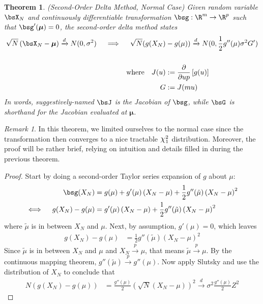 \documentclass[12pt]{article}
\theoremstyle{plain}
\newtheorem{thm}{Theorem}[section]
\theoremstyle{definition}
\theoremstyle{remark}
\newtheorem*{rmk}{Remark}
\newcommand*{\Chi}{\mbox{\large$\chi$}} %
\newcommand{\bsmu}{\boldsymbol{\mu}}
\newcommand{\pto}{\xrightarrow{p}}
\newcommand{\dto}{\xrightarrow{d}}
\begin{document}
\begin{thm}\emph{(Second-Order Delta Method, Normal Case)}
Given random variable $\bsX_N$ and continuously differentiable
transformation $\bsg:\R^m\rightarrow \R^p$
such that $\bsg'(\bsmu)=0$, the \emph{second-order delta method} states
\begin{align*}
  \sqrt{N}\left( \bsX_N -\bsmu \right)
  \dto N(0,\sigma^2)
  \quad\implies\quad
  \sqrt{N}(
  g(X_N) &- g(\mu))
  \dto
  N(0, \frac{1}{2}g''(\mu) \sigma^2 G')
  \\\\
  \text{where}\quad
  J(u)
  &:=\frac{\partial}{\partial up}
  \left[g(u)\right]\\
  G &:= J(mu)
\end{align*}
In words, suggestively-named $\bsJ$ is the Jacobian of $\bsg$, while
$\bsG$ is shorthand for the Jacobian evaluated at $\bsmu$.
\end{thm}
\begin{rmk}
In this theorem, we limited ourselves to the normal case since the
transformation then converges to a nice tractable $\Chi^2_1$
distribution. Moreover, the proof will be rather brief, relying on
intuition and details filled in during the previous theorem.
\end{rmk}
\begin{proof}
Start by doing a second-order Taylor series expansion of $g$ about $\mu$:
\begin{align*}
  \bsg(X_N)
  &=
  g(\mu)
  + g'(\mu) \left( X_N - \mu \right)
  + \frac{1}{2}g''(\tilde{\mu}) \left( X_N - \mu \right)^2
  \\
  \iff\quad
  g(X_N) - g(\mu)
  &=
  g'(\mu) \left( X_N - \mu \right)
  + \frac{1}{2}g''(\tilde{\mu}) \left( X_N - \mu \right)^2
\end{align*}
where $\tilde{\mu}$ is in between $X_N$ and $\mu$.
Next, by assumption, $g'(\mu)=0$, which leaves
\begin{align*}
  g(X_N) - g(\mu)
  &=
  \frac{1}{2}g''(\tilde{\mu}) \left( X_N - \mu \right)^2
\end{align*}
Since $\tilde{\mu}$ is in between $X_N$ and $\mu$ and
$X_N\pto \mu$, that means $\tilde{\mu}\pto \mu$.
By the continuous mapping theorem, $g''(\tilde{\mu})\pto g''(\mu)$.
Now apply Slutsky and use the distribution of $X_N$ to conclude that
\begin{align*}
  N\left(g(X_N) - g(\mu)\right)
  &=
  \frac{g''(\mu)}{2}
  \left(\sqrt{N}  \left( X_N - \mu \right) \right)^2
  \dto
  \sigma^2 \frac{g''(\mu)}{2} Z^2
\end{align*}
\end{proof}
\end{document}
